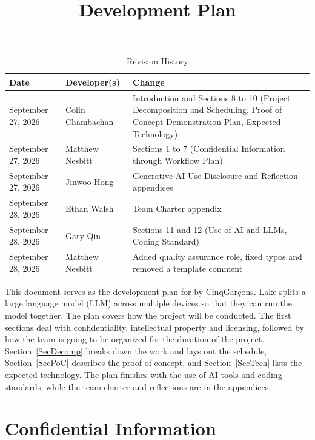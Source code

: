 \documentclass{article}
\title{Development Plan\\\progname}
\author{\authname}
\date{}
\begin{document}
\maketitle

\begin{table}[hp]
\caption{Revision History} \label{TblRevisionHistory}
\begin{tabularx}{\textwidth}{llX}
\toprule
\textbf{Date} & \textbf{Developer(s)} & \textbf{Change}\\
\midrule
September 27, 2026 & Colin Chambachan & Introduction and Sections 8 to 10
  (Project Decomposition and Scheduling, Proof of Concept Demonstration Plan,
  Expected Technology)\\
September 27, 2026 & Matthew Nesbitt & Sections 1 to 7 (Confidential
  Information through Workflow Plan)\\
September 27, 2026 & Jinwoo Hong & Generative AI Use Disclosure and
  Reflection appendices\\
September 28, 2026 & Ethan Walsh & Team Charter appendix\\
September 28, 2026 & Gary Qin & Sections 11 and 12 (Use of AI and LLMs,
  Coding Standard)\\
September 28, 2026 & Matthew Nesbitt & Added quality assurance role, fixed
  typos and removed a template comment\\
\bottomrule
\end{tabularx}
\end{table}

\newpage{}

This document serves as the development plan for \progname{} by CinqGarçons.
Lake splits a large language model (LLM) across multiple devices so that they
can run the model together. The plan covers how the project will be conducted.
The first sections deal with confidentiality, intellectual property and
licensing, followed by how the team is going to be organized for the duration
of the project. Section~\ref{SecDecomp} breaks down
the work and lays out the schedule, Section~\ref{SecPoC} describes the proof of
concept, and Section~\ref{SecTech} lists the expected technology. The plan
finishes with the use of AI tools and coding standards, while the team
charter and reflections are in the appendices. 

\section{Confidential Information}
\end{document}

